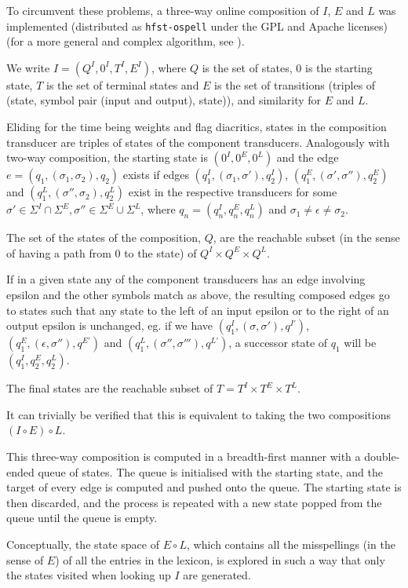 \documentclass{llncs}
\begin{document}
To circumvent these problems, a three-way online composition of $I$, $E$ and
$L$ was implemented (distributed as \verb!hfst-ospell!
under the GPL and Apache licenses) (for a more general and complex algorithm,
see \cite{Allauzen-Mohri2009}).

We write $I = (Q^I, 0^I, T^I, E^I)$, where $Q$
is the set of states, $0$ is the starting state, $T$ is the set of terminal
states and $E$ is the set of transitions (triples of (state, symbol pair
(input and output), state)), and similarity for $E$ and $L$.

Eliding for the time being weights and flag diacritics, states in the
composition transducer are triples of states of the component transducers.
Analogously with two-way composition, the starting state is $(0^I, 0^E, 0^L)$
and the edge $e = (q_1, (\sigma_1, \sigma_2), q_2)$ exists if edges
$(q^I_1, (\sigma_1, \sigma'), q^I_2)$,
$(q^E_1, (\sigma', \sigma''), q^E_2)$ and
$(q^L_1, (\sigma'', \sigma_2), q^L_2)$ exist in the respective transducers
for some
$\sigma' \in \Sigma^I \cap \Sigma^E, \sigma'' \in \Sigma^E \cup \Sigma^L$,
where $q_n = (q^I_n, q^E_n, q^L_n)$ and $\sigma_1 \neq \epsilon \neq \sigma_2$.

The set of the states of the composition, $Q$, are the reachable subset
(in the sense of having a path from $0$ to the state) of
$Q^I \times Q^E \times Q^L$.

If in a given state any of the component transducers has an edge involving
epsilon and the other symbols match as above, the resulting composed edges
go to states such that any state to the left of an input epsilon or to the
right of an output epsilon is unchanged, eg. if we have
$(q^I_1, (\sigma, \sigma'), q^{I'})$, $(q^E_1, (\epsilon, \sigma''), q^{E'})$ and
$(q^L_1, (\sigma'', \sigma'''), q^{L'})$, a successor state of $q_1$ will be
$(q^I_1, q^E_2, q^L_2)$.

The final states are the reachable subset of $T = T^I \times T^E \times T^L$.

It can trivially be verified that this is equivalent to taking the two
compositions $(I \circ E) \circ L$.

This three-way composition is computed in a breadth-first manner with a
double-ended queue of states. The queue is initialised with the starting state,
and the target of every edge is computed and pushed onto the
queue. The starting state is then discarded, and the process is repeated
with a new state popped from the queue until the queue is empty.

Conceptually, the state space of $E \circ L$, which contains all the
misspellings (in the sense of $E$) of all the entries in the lexicon, is
explored in such a way that only the states visited when looking up $I$ are
generated.
\end{document}
